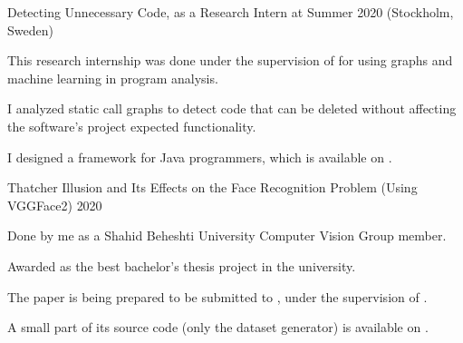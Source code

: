 

\begin{cvprojects}

  \cvproject
    {Detecting Unnecessary Code, as a Research Intern at }
    {}
    {}
    {Summer 2020 (Stockholm, Sweden)}
    {
      \begin{cvitems} %
        \item {This research internship was done under the supervision of  for using graphs and machine learning in program analysis.}
        \item {I analyzed static call graphs to detect code that can be deleted without affecting the software's project expected functionality.}
        \item {I designed a framework for Java programmers, which is available on .}
      \end{cvitems}
    }

  \cvproject
    {Thatcher Illusion and Its Effects on the Face Recognition Problem (Using VGGFace2)} %
    {} %
    {} %
    {2020} %
    {
      \begin{cvitems} %
        \item {Done by me as a Shahid Beheshti University Computer Vision Group member.}
        \item {Awarded as the best bachelor's thesis project in the university.}
        \item {The paper is being prepared to be submitted to , under the supervision of .}
        \item {A small part of its source code (only the dataset generator) is available on .}
      \end{cvitems}
    }


\end{cvprojects}
